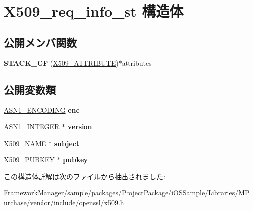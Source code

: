 \hypertarget{struct_x509__req__info__st}{}\section{X509\+\_\+req\+\_\+info\+\_\+st 構造体}
\label{struct_x509__req__info__st}
\subsection*{公開メンバ関数}
\begin{DoxyCompactItemize}
\item 
\hypertarget{struct_x509__req__info__st_a18ba0baed242babc92f28c0c80b29214}{}{\bfseries S\+T\+A\+C\+K\+\_\+\+O\+F} (\hyperlink{structx509__attributes__st}{X509\+\_\+\+A\+T\+T\+R\+I\+B\+U\+T\+E})$\ast$attributes\label{struct_x509__req__info__st_a18ba0baed242babc92f28c0c80b29214}

\end{DoxyCompactItemize}
\subsection*{公開変数類}
\begin{DoxyCompactItemize}
\item 
\hypertarget{struct_x509__req__info__st_a7db85d33e14e55ab747c4c28ed259ba5}{}\hyperlink{struct_a_s_n1___e_n_c_o_d_i_n_g__st}{A\+S\+N1\+\_\+\+E\+N\+C\+O\+D\+I\+N\+G} {\bfseries enc}\label{struct_x509__req__info__st_a7db85d33e14e55ab747c4c28ed259ba5}

\item 
\hypertarget{struct_x509__req__info__st_a3f5f148e75b34d4cdce959b0a744d7db}{}\hyperlink{structasn1__string__st}{A\+S\+N1\+\_\+\+I\+N\+T\+E\+G\+E\+R} $\ast$ {\bfseries version}\label{struct_x509__req__info__st_a3f5f148e75b34d4cdce959b0a744d7db}

\item 
\hypertarget{struct_x509__req__info__st_a58cdac102c16aadc3617e2f430b966c2}{}\hyperlink{struct_x509__name__st}{X509\+\_\+\+N\+A\+M\+E} $\ast$ {\bfseries subject}\label{struct_x509__req__info__st_a58cdac102c16aadc3617e2f430b966c2}

\item 
\hypertarget{struct_x509__req__info__st_a6aa13ec7edfacffb598f1c024c28ad46}{}\hyperlink{struct_x509__pubkey__st}{X509\+\_\+\+P\+U\+B\+K\+E\+Y} $\ast$ {\bfseries pubkey}\label{struct_x509__req__info__st_a6aa13ec7edfacffb598f1c024c28ad46}

\end{DoxyCompactItemize}


この構造体詳解は次のファイルから抽出されました\+:\begin{DoxyCompactItemize}
\item 
Framework\+Manager/sample/packages/\+Project\+Package/i\+O\+S\+Sample/\+Libraries/\+M\+Purchase/vendor/include/openssl/x509.\+h\end{DoxyCompactItemize}
